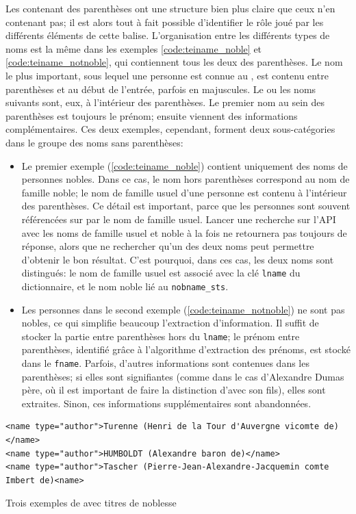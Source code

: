 Les \tname{} contenant des parenthèses ont une structure bien plus claire que ceux n'en contenant pas; il est alors tout à fait possible d'identifier le rôle joué par les différents éléments de cette balise. L'organisation entre les différents types de noms est la même dans les exemples \ref{code:teiname_noble} et \ref{code:teiname_notnoble}, qui contiennent tous les deux des parenthèses. Le nom le plus important, sous lequel une personne est connue au , est contenu entre parenthèses et au début de l'entrée, parfois en majuscules. Le ou les noms suivants sont, eux, à l'intérieur des parenthèses. Le premier nom au sein des parenthèses est toujours le prénom; ensuite viennent des informations complémentaires. Ces deux exemples, cependant, forment deux sous-catégories dans le groupe des noms sans parenthèses:
\begin{itemize}
	\item Le premier exemple (\ref{code:teiname_noble}) contient uniquement des noms de personnes nobles. Dans ce cas, le nom hors parenthèses correspond au nom de famille noble; le nom de famille usuel d'une personne est contenu à l'intérieur des parenthèses. Ce détail est important, parce que les personnes sont souvent référencées sur \wkd{} par le nom de famille usuel. Lancer une recherche sur l'API avec les noms de famille usuel et noble à la fois ne retournera pas toujours de réponse, alors que ne rechercher qu'un des deux noms peut permettre d'obtenir le bon résultat. C'est pourquoi, dans ces cas, les deux noms sont distingués: le nom de famille usuel est associé avec la clé \texttt{lname} du \gls{dictionnaire}, et le nom noble lié au \texttt{nobname\_sts}.
	\item Les personnes dans le second exemple (\ref{code:teiname_notnoble}) ne sont pas nobles, ce qui simplifie beaucoup l'extraction d'information. Il suffit de stocker la partie entre parenthèses hors du \texttt{lname}; le prénom entre parenthèses, identifié grâce à l'algorithme d'extraction des prénoms, est stocké dans le \texttt{fname}. Parfois, d'autres informations sont contenues dans les parenthèses; si elles sont signifiantes (comme dans le cas d'Alexandre Dumas père, où il est important de faire la distinction d'avec son fils), elles sont extraites. Sinon, ces informations supplémentaires sont abandonnées.
\end{itemize}

\begin{listing}[h]
	\begin{verbatim}
<name type="author">Turenne (Henri de la Tour d'Auvergne vicomte de)</name>
<name type="author">HUMBOLDT (Alexandre baron de)</name>
<name type="author">Tascher (Pierre-Jean-Alexandre-Jacquemin comte Imbert de)<name>
	\end{verbatim}
	\caption{Trois exemples de \tname{} avec titres de noblesse}
	\label{code:teiname_noble}
\end{listing}

